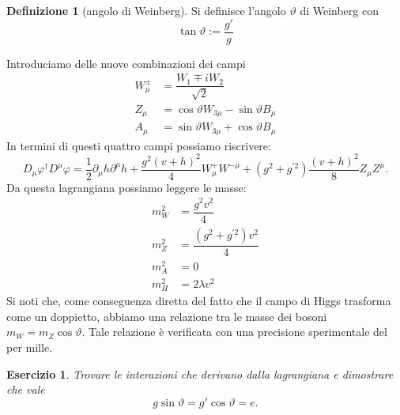 \documentclass[italian,a4paper]{article}
\newtheorem{exercise}{Esercizio}
\theoremstyle{definition}
\newtheorem*{definition}{Definizione}
\renewcommand{\theta}{\vartheta}
\begin{document}
\begin{definition}
    [angolo di Weinberg]
    Si definisce l'angolo $\theta$ di Weinberg con
    \begin{equation*}
        \tan \theta \mathop:= \dfrac{g'}{g}
    \end{equation*}
\end{definition}
Introduciamo delle nuove combinazioni dei campi
\begin{align*}
    W^{\pm}_\mu &= \dfrac{W_1 \mp i W_2}{\sqrt{2}}\\
    Z_\mu &= \cos \theta W_{3\mu} - \sin \theta B_{\mu}\\
    A_\mu &= \sin \theta W_{3\mu} + \cos \theta B_\mu
\end{align*}
In termini di questi quattro campi possiamo riscrivere:
\begin{equation*}
    D_\mu \varphi^\dagger D^\mu \varphi =
    \dfrac{1}{2}\partial_\mu h \partial^\mu h +
    \dfrac{g^2(v + h)^2}{4}
    W_\mu^+W^{-\mu} +
    (g^2 + g^{'2})
    \dfrac{(v + h)^2}{8}
    Z_\mu Z^\mu.
\end{equation*}
Da questa lagrangiana possiamo leggere le masse:
\begin{align*}
    m_W^2 &= \dfrac{g^2 v^2}{4}\\
    m_Z^2 &= \dfrac{(g^2 + g^{'2})v^2}{4}\\
    m_A^2 &= 0\\
    m_H^2 &= 2\lambda v^2
\end{align*}
Si noti che, come conseguenza diretta del fatto che il campo di Higgs
trasforma come un doppietto, abbiamo una relazione tra le masse dei bosoni
$m_W = m_Z \cos \theta$. Tale relazione \`e verificata con una precisione
sperimentale del per mille.
\begin{exercise}
    Trovare le interazioni che derivano dalla lagrangiana e dimostrare che
    vale
    \begin{equation*}
        g \sin \theta = g' \cos \theta = e.
    \end{equation*}
\end{exercise}
\end{document}
